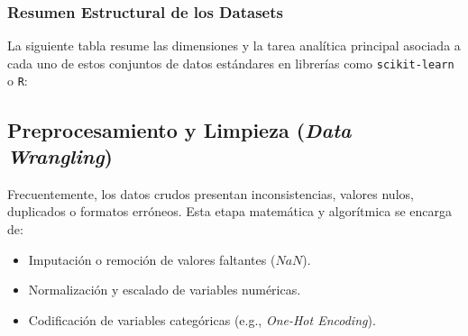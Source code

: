 \vspace{0.4cm}
\subsubsection{Resumen Estructural de los Datasets}

La siguiente tabla resume las dimensiones y la tarea analítica principal asociada a cada uno de estos conjuntos de datos estándares en librerías como \texttt{scikit-learn} o \texttt{R}:

\begin{table}[h]
\centering
\caption{Dimensiones y tareas analíticas de los \textit{toy datasets} más comunes.}
\vspace{0.2cm}
\end{table}



\subsection{Preprocesamiento y Limpieza (\textit{Data Wrangling})}
Frecuentemente, los datos crudos presentan inconsistencias, valores nulos, duplicados o formatos erróneos. Esta etapa matemática y algorítmica se encarga de:
\begin{itemize}
    \item Imputación o remoción de valores faltantes ($NaN$).
    \item Normalización y escalado de variables numéricas.
    \item Codificación de variables categóricas (e.g., \textit{One-Hot Encoding}).
\end{itemize}


